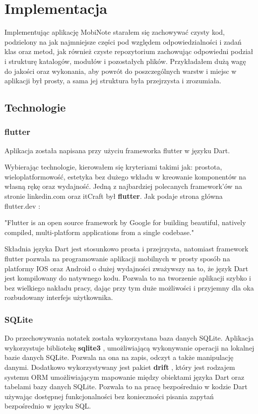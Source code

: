 \chapter{Implementacja}
    
Implementując aplikację MobiNote starałem się zachowywać czysty kod, podzielony na jak najmniejsze części pod względem odpowiedzialności i zadań klas oraz metod, jak również czyste repozytorium zachowując odpowiedni podział i strukturę katalogów, modułów i pozostałych plików. Przykładałem dużą wagę do jakości oraz wykonania, aby powrót do poszczególnych warstw i miejsc w aplikacji był prosty, a sama jej struktura była przejrzysta i zrozumiała. 

\section{Technologie}

\subsection{flutter}

Aplikacja została napisana przy użyciu frameworka flutter w języku Dart.

Wybierając technologie, kierowałem się kryteriami takimi jak: prostota, wieloplatformowość, estetyka bez dużego wkładu w kreowanie komponentów na własną rękę oraz wydajność. Jedną z najbardziej polecanych framework'ów na stronie  linkedin.com \cite{linkedin} oraz itCraft \cite{itCraft} był \textbf{flutter}. Jak podaje strona główna flutter.dev \cite{flutter}:

"Flutter is an open source framework by Google for building beautiful, natively compiled, multi-platform applications from a single codebase."

Składnia języka Dart jest stosunkowo prosta i przejrzysta, natomiast framework flutter pozwala na programowanie aplikacji mobilnych w prosty sposób na platformy IOS oraz Android o dużej wydajności zważywszy na to, że język Dart jest kompilowany do natywnego kodu. Pozwala to na tworzenie aplikacji szybko i bez wielkiego nakładu pracy, dając przy tym duże możliwości i przyjemny dla oka rozbudowany interfejs użytkownika.

\subsection{SQLite}

Do przechowywania notatek została wykorzystana baza danych SQLite. Aplikacja wykorzystuje bibliotekę \textbf{sqlite3} \cite{sqlite3}, umożliwiającą wykonywanie operacji na lokalnej bazie danych SQLite. Pozwala na ona na zapis, odczyt a także manipulację danymi. Dodatkowo wykorzystywany jest pakiet \textbf{drift} \cite{drift}, który jest rodzajem systemu ORM umożliwiającym mapowanie między obiektami języka Dart oraz tabelami bazy danych SQLite. Pozwala to na pracę bezpośrednio w kodzie Dart używając dostępnej funkcjonalności bez konieczności pisania zapytań bezpośrednio w języku SQL.


